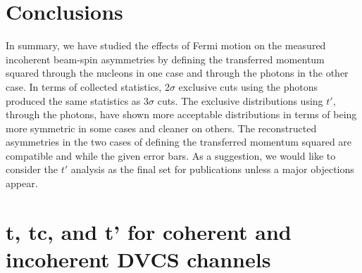 \documentclass[a4paper,11pt,twoside]{article}
\begin{document}
\section*{Conclusions}
In summary, we have studied the effects of Fermi motion on the measured 
incoherent beam-spin asymmetries by defining the transferred momentum squared 
through the nucleons in one case and through the photons in the other case. In 
terms of collected statistics, 2$\sigma$ exclusive cuts using the photons 
produced the same statistics as 3$\sigma$ cuts. The exclusive distributions 
using $t'$, through the photons, have shown more acceptable distributions in 
terms of being more symmetric in some cases and cleaner on others. The 
reconstructed asymmetries in the two cases of defining the transferred momentum 
squared are compatible and while the given error bars. As a suggestion, we 
would like to consider the $t'$ analysis as the final set for publications 
unless a major objections appear.

\newpage
\newpage
\newpage
\newpage
\newpage
\section*{t, tc, and t' for coherent and incoherent DVCS channels}

\end{document}
